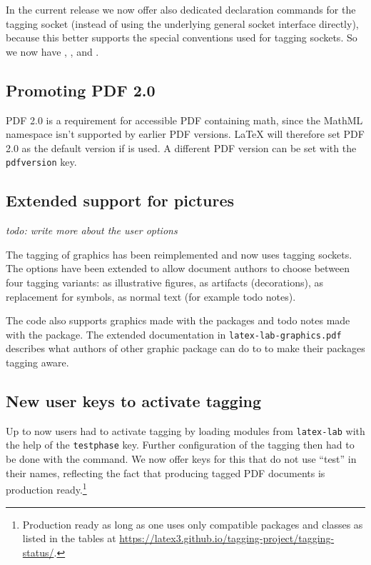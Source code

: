 \documentclass{ltnews}
\begin{document}
In the current release we now offer also dedicated declaration
commands for the tagging socket (instead of using the underlying
general socket interface directly), because this better supports the
special conventions used for tagging sockets. So we now have
, , and
.


\subsection{Promoting PDF 2.0}

PDF 2.0 is a requirement for accessible PDF containing math, since the
MathML namespace isn't supported by earlier PDF versions. \LaTeX{}
will therefore set PDF 2.0 as the default version if
 is used. A different PDF version can be set with
the \texttt{pdfversion} key.

\subsection{Extended support for pictures}

\emph{todo: write more about the user options}

The tagging of graphics has been reimplemented and now uses
tagging sockets.  The options have been extended to allow document authors to choose between four
tagging variants: as illustrative figures, as artifacts (decorations), as replacement for symbols, as normal text (for example todo notes).

The code also supports graphics made with the 
 packages and todo notes made with the  package.
The extended documentation in \texttt{latex-lab-graphics.pdf} describes what authors of other graphic package can do to 
to make their packages tagging aware.


\subsection{New user keys to activate tagging}

Up to now users had to activate tagging by loading modules from
\texttt{latex-lab} with the help of the \texttt{testphase}
key. Further configuration of the tagging then had to be done with the
 command.  We now offer keys for this that do not use
\enquote{test} in their names, reflecting the fact that producing
tagged PDF documents is production ready.\footnote{Production ready as
long as one uses only compatible packages and classes as listed in the
tables at
\url{https://latex3.github.io/tagging-project/tagging-status/}.}
\end{document}
